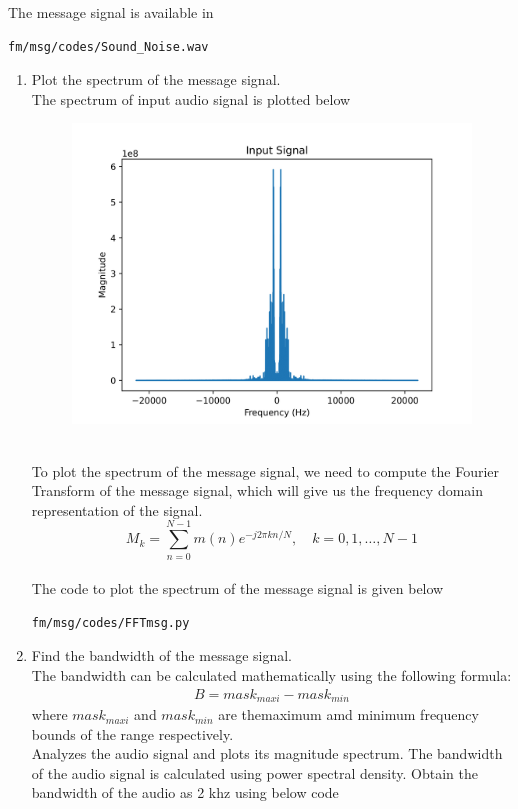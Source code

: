 The message signal is available in 
\begin{lstlisting}
fm/msg/codes/Sound_Noise.wav
\end{lstlisting}
\begin{enumerate}[label=\arabic*.,ref=\thesection.\theenumi]
\item Plot the spectrum of the message signal.\\
\solution The spectrum of input audio signal is plotted below\\
\begin{figure}[h]
    \includegraphics[scale=0.55]{fm/msg/inputs-1.png}
\end{figure}
\\
To plot the spectrum of the message signal, we need to compute the Fourier Transform of the message signal, which will give us the frequency domain representation of the signal.
\begin{equation}
M_k = \sum_{n=0}^{N-1} m(n) e^{-j2\pi kn/N}, \quad k=0,1,\dots,N-1
\end{equation}
\\
The code to plot the spectrum of the message signal is given below
\begin{lstlisting}
fm/msg/codes/FFTmsg.py
\end{lstlisting}
\item Find the bandwidth of the message signal.\\
\solution The bandwidth can be calculated mathematically using the following formula:
\begin{align*}
B=mask_{maxi}-mask_{min}
\end{align*}
where $mask_{maxi}$ and $mask_{min} $ are themaximum amd minimum frequency bounds of the range  respectively.\\
Analyzes the audio signal and plots its magnitude spectrum. The bandwidth of the audio signal is  calculated using power spectral density. Obtain the bandwidth of the audio as 2 khz using below code
\begin{center}
\end{center}
\end{enumerate}
